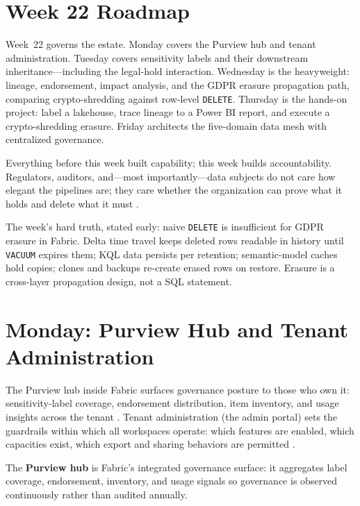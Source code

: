 \section{Week 22 Roadmap}
Week~22 governs the estate. Monday covers the Purview hub and tenant administration. Tuesday covers sensitivity labels and their downstream inheritance---including the legal-hold interaction. Wednesday is the heavyweight: lineage, endorsement, impact analysis, and the GDPR erasure propagation path, comparing crypto-shredding against row-level \texttt{DELETE}. Thursday is the hands-on project: label a lakehouse, trace lineage to a Power BI report, and execute a crypto-shredding erasure. Friday architects the five-domain data mesh with centralized governance.

Everything before this week built capability; this week builds accountability. Regulators, auditors, and---most importantly---data subjects do not care how elegant the pipelines are; they care whether the organization can prove what it holds and delete what it must \cite{microsoftPurviewFabric,microsoftFabricLineage}.

\begin{notebox}
The week's hard truth, stated early: naive \texttt{DELETE} is insufficient for GDPR erasure in Fabric. Delta time travel keeps deleted rows readable in history until \texttt{VACUUM} expires them; KQL data persists per retention; semantic-model caches hold copies; clones and backups re-create erased rows on restore. Erasure is a cross-layer propagation design, not a SQL statement.
\end{notebox}

\section{Monday: Purview Hub and Tenant Administration}
The Purview hub inside Fabric surfaces governance posture to those who own it: sensitivity-label coverage, endorsement distribution, item inventory, and usage insights across the tenant \cite{microsoftPurviewFabric}. Tenant administration (the admin portal) sets the guardrails within which all workspaces operate: which features are enabled, which capacities exist, which export and sharing behaviors are permitted \cite{microsoftFabricTenantSettings}.

\begin{definitionbox}
The \textbf{Purview hub} is Fabric's integrated governance surface: it aggregates label coverage, endorsement, inventory, and usage signals so governance is observed continuously rather than audited annually.
\end{definitionbox}

